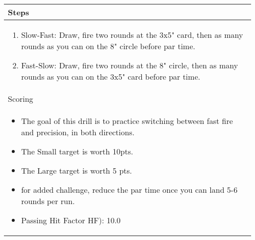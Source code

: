 \documentclass[../Cover.tex]{subfiles}
\begin{document}
	\begin{tabular}{ | p{} |}
		\hline
		Steps\\ 
		\hline
		\tiny \begin{enumerate}[topsep=0pt, partopsep=0pt]
			\item Slow-Fast: Draw, fire two rounds at the 3x5" card, then as many rounds as you can on the 8" circle before par time.
			\item Fast-Slow: Draw, fire two rounds at the 8" circle, then as many rounds as you can on the 3x5" card before par time.
		\end{enumerate}		
		\\ [0.25\textheight]
		\hline
		Scoring \\
		\hline
		\tiny \begin{itemize}[topsep=0pt, partopsep=0pt]
			\item The goal of this drill is to practice switching between fast fire and precision, in both directions.
			\item The Small target is worth 10pts.
			\item The Large target is worth 5 pts.
			\item for added challenge, reduce the par time once you can land 5-6 rounds per run.
			\item Passing Hit Factor HF): 10.0
		\end{itemize}		
		\\ [0.25\textheight]
		\hline
	\end{tabular}
\end{document}
